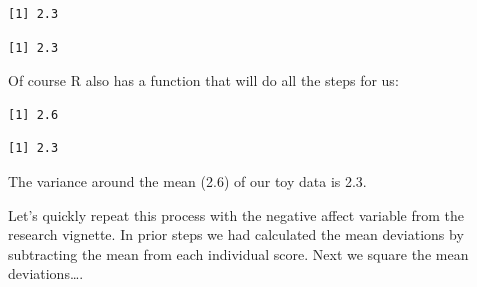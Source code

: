 \documentclass[
  11pt,
]{book}
\newenvironment{Shaded}{\begin{snugshade}}{\end{snugshade}}
\newcommand{\AttributeTok}[1]{\textcolor[rgb]{0.77,0.63,0.00}{#1}}
\newcommand{\CommentTok}[1]{\textcolor[rgb]{0.56,0.35,0.01}{\textit{#1}}}
\newcommand{\ConstantTok}[1]{\textcolor[rgb]{0.00,0.00,0.00}{#1}}
\newcommand{\DecValTok}[1]{\textcolor[rgb]{0.00,0.00,0.81}{#1}}
\newcommand{\FunctionTok}[1]{\textcolor[rgb]{0.00,0.00,0.00}{#1}}
\newcommand{\NormalTok}[1]{#1}
\newcommand{\OtherTok}[1]{\textcolor[rgb]{0.56,0.35,0.01}{#1}}
\newcommand{\SpecialCharTok}[1]{\textcolor[rgb]{0.00,0.00,0.00}{#1}}
\begin{document}
\begin{verbatim}
[1] 2.3
\end{verbatim}

\begin{Shaded}
\end{Shaded}

\begin{verbatim}
[1] 2.3
\end{verbatim}

Of course R also has a function that will do all the steps for us:

\begin{Shaded}
\end{Shaded}

\begin{verbatim}
[1] 2.6
\end{verbatim}

\begin{Shaded}
\end{Shaded}

\begin{verbatim}
[1] 2.3
\end{verbatim}

The variance around the mean (2.6) of our toy data is 2.3.

Let's quickly repeat this process with the negative affect variable from the research vignette. In prior steps we had calculated the mean deviations by subtracting the mean from each individual score. Next we square the mean deviations\ldots.
\end{document}
